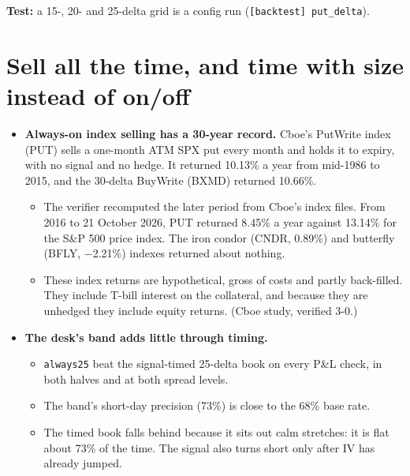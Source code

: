 \documentclass{article}
\begin{document}
\textbf{Test:} a 15-, 20- and 25-delta grid is a config run (\texttt{[backtest] put\_\allowbreak{}delta}).

\section{Sell all the time, and time with size instead of on/\allowbreak{}off}

\begin{itemize}

\item \textbf{Always-on index selling has a 30-year record.} Cboe's PutWrite index (PUT) sells a one-month ATM SPX put every month and holds it to expiry, with no signal and no hedge. It returned 10.13\% a year from mid-1986 to 2015, and the 30-delta BuyWrite (BXMD) returned 10.66\%.

\begin{itemize}

\item The verifier recomputed the later period from Cboe's index files. From 2016 to 21 October 2026, PUT returned 8.45\% a year against 13.14\% for the S\&P 500 price index. The iron condor (CNDR, 0.89\%) and butterfly (BFLY, \ensuremath{-}2.21\%) indexes returned about nothing.

\item These index returns are hypothetical, gross of costs and partly back-filled. They include T-bill interest on the collateral, and because they are unhedged they include equity returns. (Cboe study, verified 3-0.)

\end{itemize}

\item \textbf{The desk's band adds little through timing.}

\begin{itemize}

\item \texttt{always25} beat the signal-timed 25-delta book on every P\&L check, in both halves and at both spread levels.

\item The band's short-day precision (73\%) is close to the 68\% base rate.

\item The timed book falls behind because it sits out calm stretches: it is flat about 73\% of the time. The signal also turns short only after IV has already jumped.

\end{itemize}


\end{itemize}
\end{document}
